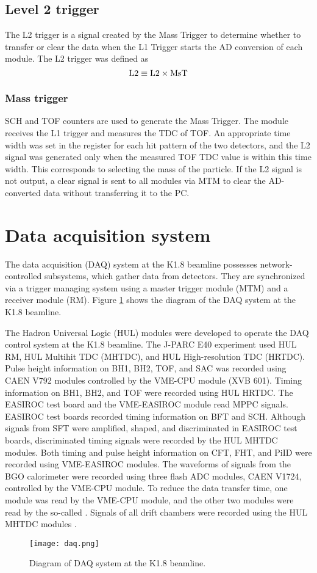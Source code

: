 \subsection{Level 2 trigger}
The L2 trigger is a signal created by the Mass Trigger to determine whether to transfer or clear the data when the L1 Trigger starts the AD conversion of each module. The L2 trigger was defined as 
\begin{equation}
  {\rm L2 \equiv L2 \times MsT}
\end{equation}

%
\subsubsection{Mass trigger}
SCH and TOF counters are used to generate the Mass Trigger. The module receives the L1 trigger and measures the TDC of TOF. An appropriate time width was set in the register for each hit pattern of the two detectors, and the L2 signal was generated only when the measured TOF TDC value is within this time width. This corresponds to selecting the mass of the particle. If the L2 signal is not output, a clear signal is sent to all modules via MTM to clear the AD-converted data without transferring it to the PC. 


\section{Data acquisition system}
The data acquisition (DAQ) system at the K1.8 beamline possesses network-controlled subsystems, which gather data from detectors. They are synchronized via a trigger managing system using a master trigger module (MTM) and a receiver module (RM). Figure \ref{fig-daq} shows the diagram of the DAQ system at the K1.8 beamline.

The Hadron Universal Logic (HUL) modules were developed to operate the DAQ control system at the K1.8 beamline. The J-PARC E40 experiment used HUL RM, HUL Multihit TDC (MHTDC), and HUL High-resolution TDC (HRTDC). Pulse height information on BH1, BH2, TOF, and SAC was recorded using CAEN V792 modules controlled by the VME-CPU module (XVB 601). Timing information on BH1, BH2, and TOF were recorded using HUL HRTDC. The EASIROC test board and the VME-EASIROC module read MPPC signals. EASIROC test boards recorded timing information on BFT and SCH. Although signals from SFT were amplified, shaped, and discriminated in EASIROC test boards, discriminated timing signals were recorded by the HUL MHTDC modules. Both timing and pulse height information on CFT, FHT, and PiID were recorded using VME-EASIROC modules. The waveforms of signals from the BGO calorimeter were recorded using three flash ADC modules, CAEN V1724, controlled by the VME-CPU module. To reduce the data transfer time, one module was read by the VME-CPU module, and the other two modules were read by the so-called . Signals of all drift chambers were recorded using the HUL MHTDC modules \cite{Nana-D}.

\begin{figure}[!h]
 \begin{center}
   \texttt{[image: daq.png]}
   \caption{Diagram of DAQ system at the K1.8 beamline.}
   \label{fig-daq}
 \end{center}
\end{figure}

%
